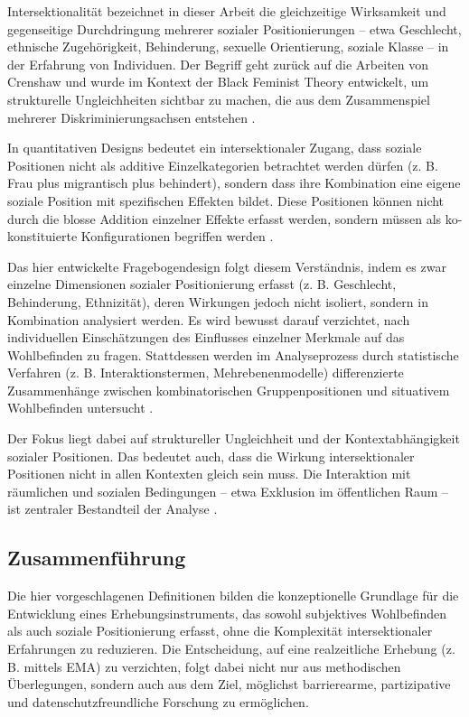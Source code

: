 Intersektionalität bezeichnet in dieser Arbeit die gleichzeitige Wirksamkeit und gegenseitige Durchdringung mehrerer sozialer Positionierungen – etwa Geschlecht, ethnische Zugehörigkeit, Behinderung, sexuelle Orientierung, soziale Klasse – in der Erfahrung von Individuen. Der Begriff geht zurück auf die Arbeiten von Crenshaw und wurde im Kontext der Black Feminist Theory entwickelt, um strukturelle Ungleichheiten sichtbar zu machen, die aus dem Zusammenspiel mehrerer Diskriminierungsachsen entstehen \parencite{crenshawMappingMarginsIntersectionality1991, bauerIntersectionalityQuantitativeResearch2021}.

In quantitativen Designs bedeutet ein intersektionaler Zugang, dass soziale Positionen nicht als additive Einzelkategorien betrachtet werden dürfen (z. B. \glqq Frau\grqq{} plus \glqq migrantisch\grqq{} plus \glqq behindert\grqq{}), sondern dass ihre Kombination eine eigene soziale Position mit spezifischen Effekten bildet. Diese Positionen können nicht durch die blosse Addition einzelner Effekte erfasst werden, sondern müssen als ko-konstituierte Konfigurationen begriffen werden \parencite{hancockWhenMultiplicationDoesnt2007, bauerIntersectionalityQuantitativeResearch2021}.

Das hier entwickelte Fragebogendesign folgt diesem Verständnis, indem es zwar einzelne Dimensionen sozialer Positionierung erfasst (z. B. Geschlecht, Behinderung, Ethnizität), deren Wirkungen jedoch nicht isoliert, sondern in Kombination analysiert werden. Es wird bewusst darauf verzichtet, nach individuellen Einschätzungen des Einflusses einzelner Merkmale auf das Wohlbefinden zu fragen. Stattdessen werden im Analyseprozess durch statistische Verfahren (z. B. Interaktionstermen, Mehrebenenmodelle) differenzierte Zusammenhänge zwischen kombinatorischen Gruppenpositionen und situativem Wohlbefinden untersucht \parencite{bauerIntersectionalityQuantitativeResearch2021}.

Der Fokus liegt dabei auf struktureller Ungleichheit und der Kontextabhängigkeit sozialer Positionen. Das bedeutet auch, dass die Wirkung intersektionaler Positionen nicht in allen Kontexten gleich sein muss. Die Interaktion mit räumlichen und sozialen Bedingungen – etwa Exklusion im öffentlichen Raum – ist zentraler Bestandteil der Analyse \parencite{rodo-de-zarateDevelopingGeographiesIntersectionality2014}.

\subsection{Zusammenführung}

Die hier vorgeschlagenen Definitionen bilden die konzeptionelle Grundlage für die Entwicklung eines Erhebungsinstruments, das sowohl subjektives Wohlbefinden als auch soziale Positionierung erfasst, ohne die Komplexität intersektionaler Erfahrungen zu reduzieren. Die Entscheidung, auf eine realzeitliche Erhebung (z. B. mittels EMA) zu verzichten, folgt dabei nicht nur aus methodischen Überlegungen, sondern auch aus dem Ziel, möglichst barrierearme, partizipative und datenschutzfreundliche Forschung zu ermöglichen.
